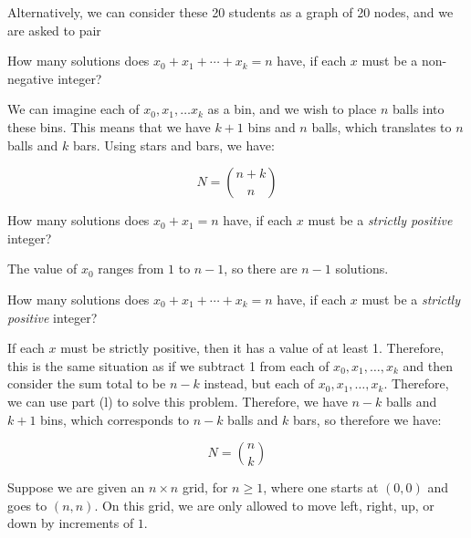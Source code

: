 \documentclass[11pt]{article}
\begin{document}
\begin{Parts}
\begin{solution}
    Alternatively, we can consider these 20 students as a graph of 20 nodes, and we are asked to pair 
  \end{solution}

  
\Part How many solutions does $x_0 + x_1 + \cdots + x_k = n$ have, if each $x$ must be a non-negative integer?

\begin{solution}
  We can imagine each of $x_0, x_1, \dots x_k$ as a bin, and we wish to place $n$ balls into these bins. This means that we have $k+1$ bins and $n$ balls, which translates to $n$ balls and $k$ bars. Using stars and bars, we have:

  \[ N = {n + k \choose n}\]
\end{solution}

\Part How many solutions does $x_0 + x_1 = n$ have, if each $x$ must be a \emph{strictly positive} integer?

\begin{solution}
  The value of $x_0$ ranges from $1$ to $n-1$, so there are $n-1$ solutions. 
\end{solution}

\Part How many solutions does $x_0 + x_1 + \cdots + x_k = n$ have, if each $x$ must be a \emph{strictly positive} integer?

\begin{solution}
  If each $x$ must be strictly positive, then it has a value of at least 1. Therefore, this is the same situation as if we subtract 1 from each of $x_0, x_1, \dots, x_k$ and then consider the sum total to be $n-k$ instead, but each of $x_0, x_1, \dots, x_k$. Therefore, we can use part (l) to solve this problem. Therefore, we have $n-k$ balls and $k+1$ bins, which corresponds to $n-k$ balls and $k$ bars, so therefore we have: 

  \[ N = {n \choose k}\]
\end{solution}

\end{Parts}
\pagebreak
{}

Suppose we are given an $n \times n$ grid, for $n \geq 1$, where one starts at $(0,0)$ and goes to $(n,n)$. On this grid, we are only allowed to move left, right, up, or down by increments of $1$.
\end{document}

